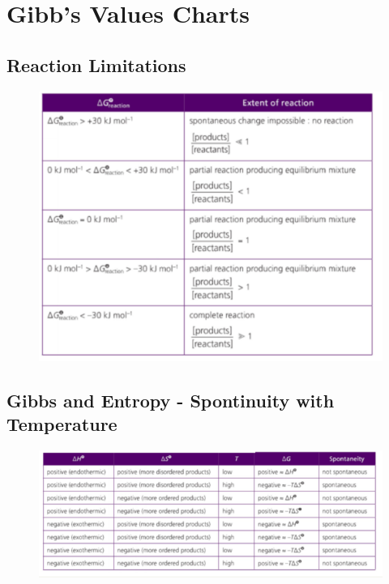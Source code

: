 \documentclass[12pt]{article}
\begin{document}
\section{Gibb's Values Charts}

\subsection{Reaction Limitations}
\begin{figure}[H]
	\centering
	\includegraphics[width=\textwidth]{1.6fig1.png}
\end{figure}

\subsection{Gibbs and Entropy - Spontinuity with Temperature}

\begin{figure}[H]
	\centering
	\includegraphics[width=\textwidth]{1.6fig2.png}
\end{figure}
\end{document}
